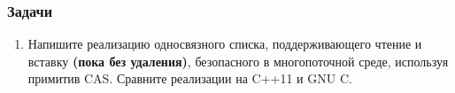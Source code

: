 \documentclass[aspectratio=169, pdf, 8pt, unicode]{beamer}
\begin{document}
\begin{frame}
\frametitle{Задачи}
\begin{enumerate}
\item Напишите реализацию односвязного списка, поддерживающего чтение и вставку \textbf{(пока без удаления)}, безопасного в многопоточной среде,
   используя примитив CAS. Сравните реализации на C++11 и GNU C.
\end{enumerate}
\end{frame}
\end{document}
